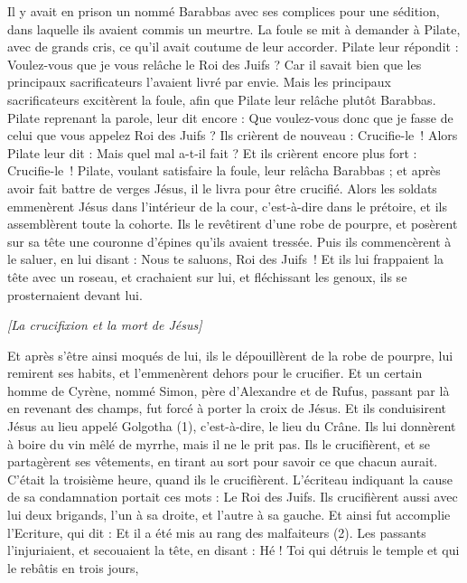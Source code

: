 \begin{multicols}{2}
Il y avait en prison un nommé Barabbas avec ses complices pour une sédition, dans laquelle ils avaient commis un meurtre.
La foule se mit à demander à Pilate, avec de grands cris, ce qu’il avait coutume de leur accorder.
Pilate leur répondit : Voulez-vous que je vous relâche le Roi des Juifs ?
Car il savait bien que les principaux sacrificateurs l'avaient livré par envie.
Mais les principaux sacrificateurs excitèrent la foule, afin que Pilate leur relâche plutôt Barabbas.
Pilate reprenant la parole, leur dit encore : Que voulez-vous donc que je fasse de celui que vous appelez Roi des Juifs ?
Ils crièrent de nouveau : Crucifie-le !
Alors Pilate leur dit : Mais quel mal a-t-il fait ? Et ils crièrent encore plus fort : Crucifie-le !
Pilate, voulant satisfaire la foule, leur relâcha Barabbas ; et après avoir fait battre de verges Jésus, il le livra pour être crucifié.
Alors les soldats emmenèrent Jésus dans l’intérieur de la cour, c’est-à-dire dans le prétoire, et ils assemblèrent toute la cohorte.
Ils le revêtirent d'une robe de pourpre, et posèrent sur sa tête une couronne d'épines qu’ils avaient tressée.
Puis ils commencèrent à le saluer, en lui disant : Nous te saluons, Roi des Juifs !
Et ils lui frappaient la tête avec un roseau, et crachaient sur lui, et fléchissant les genoux, ils se prosternaient devant lui.
\begin{center}
\textit{[La crucifixion et la mort de Jésus]}
\end{center}
\PPE{}
Et après s'être ainsi moqués de lui, ils le dépouillèrent de la robe de pourpre, lui remirent ses habits, et l'emmenèrent dehors pour le crucifier.
Et un certain homme de Cyrène, nommé Simon, père d’Alexandre et de Rufus, passant par là en revenant des champs, fut forcé à porter la croix de Jésus.
Et ils conduisirent Jésus au lieu appelé Golgotha (1), c'est-à-dire, le lieu du Crâne.
Ils lui donnèrent à boire du vin mêlé de myrrhe, mais il ne le prit pas.
Ils le crucifièrent, et se partagèrent ses vêtements, en tirant au sort pour savoir ce que chacun aurait.
C’était la troisième heure, quand ils le crucifièrent.
L’écriteau indiquant la cause de sa condamnation portait ces mots : Le Roi des Juifs.
Ils crucifièrent aussi avec lui deux brigands, l'un à sa droite, et l'autre à sa gauche.
Et ainsi fut accomplie l'Ecriture, qui dit : Et il a été mis au rang des malfaiteurs (2).
Les passants l’injuriaient, et secouaient la tête, en disant : Hé ! Toi qui détruis le temple et qui le rebâtis en trois jours,

\end{multicols}
